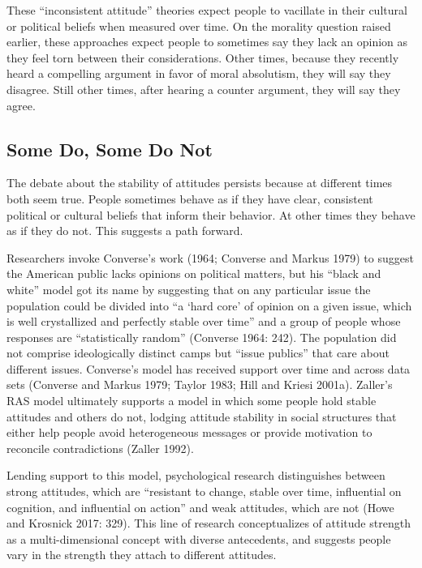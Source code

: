 \documentclass[12pt,]{article}
\begin{document}
These ``inconsistent attitude'' theories expect people to vacillate in their cultural or political beliefs when measured over time. On the morality question raised earlier, these approaches expect people to sometimes say they lack an opinion as they feel torn between their considerations. Other times, because they recently heard a compelling argument in favor of moral absolutism, they will say they disagree. Still other times, after hearing a counter argument, they will say they agree.

\hypertarget{some-do-some-do-not}{%
\subsection{Some Do, Some Do Not}\label{some-do-some-do-not}}

The debate about the stability of attitudes persists because at different times both seem true. People sometimes behave as if they have clear, consistent political or cultural beliefs that inform their behavior. At other times they behave as if they do not. This suggests a path forward.

Researchers invoke Converse's work (1964; Converse and Markus 1979) to suggest the American public lacks opinions on political matters, but his ``black and white'' model got its name by suggesting that on any particular issue the population could be divided into ``a `hard core' of opinion on a given issue, which is well crystallized and perfectly stable over time'' and a group of people whose responses are ``statistically random'' (Converse 1964: 242). The population did not comprise ideologically distinct camps but ``issue publics'' that care about different issues. Converse's model has received support over time and across data sets (Converse and Markus 1979; Taylor 1983; Hill and Kriesi 2001a). Zaller's RAS model ultimately supports a model in which some people hold stable attitudes and others do not, lodging attitude stability in social structures that either help people avoid heterogeneous messages or provide motivation to reconcile contradictions (Zaller 1992).

Lending support to this model, psychological research distinguishes between strong attitudes, which are ``resistant to change, stable over time, influential on cognition, and influential on action'' and weak attitudes, which are not (Howe and Krosnick 2017: 329). This line of research conceptualizes of attitude strength as a multi-dimensional concept with diverse antecedents, and suggests people vary in the strength they attach to different attitudes.
\end{document}
